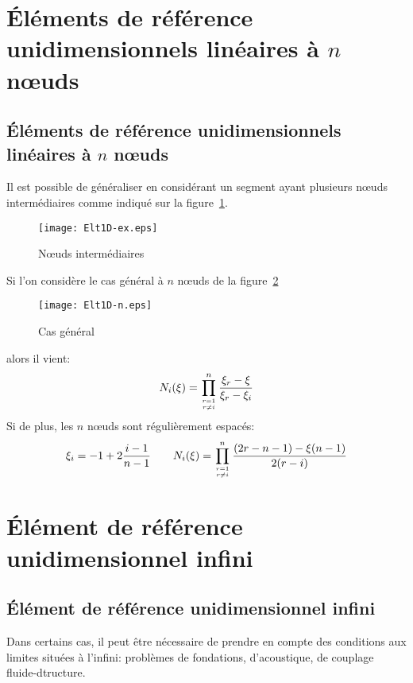 \medskip
{}




\medskip
\ifVersionAvecExemplesSepares
   \section{Éléments de référence unidimensionnels linéaires à $n$ nœuds}
\else
   \subsection{Éléments de référence unidimensionnels linéaires à $n$ nœuds}
\fi

Il est possible de généraliser en considérant un segment ayant plusieurs nœuds 
intermédiaires comme indiqué sur la figure~\ref{fig:ex2:noeudint}.
\begin{figure}[ht]\centering
\texttt{[image: Elt1D-ex.eps]}
\caption{Nœuds  intermédiaires}\label{fig:ex2:noeudint}
\end{figure}
\medskip
Si l'on considère le cas général à $n$ nœuds de la figure~\ref{fig:ex2:casgen}
\begin{figure}[ht]\centering
\texttt{[image: Elt1D-n.eps]}
\caption{Cas général}\label{fig:ex2:casgen}
\end{figure}
alors il vient:
\begin{equation} N_i(\xi) = \prod_{r=1\atop r\ne i}^n \dfrac{\xi_r-\xi}{\xi_r-\xi_i} \end{equation}
\medskip
Si de plus, les $n$ nœuds sont régulièrement espacés:
\begin{equation}\xi_i = -1+2\frac{i-1}{n-1} \qquad
N_i(\xi) = \prod_{r=1\atop r\ne i}^n \dfrac{(2r-n-1)-\xi(n-1)}{2(r-i)} \end{equation}

\medskip
\ifVersionAvecExemplesSepares
   \section{Élément de référence unidimensionnel infini}
\else
   \subsection{Élément de référence unidimensionnel infini}
\fi

Dans certains cas, il peut être nécessaire de prendre en compte des conditions aux limites situées à
l'infini: problèmes de fondations, d'acoustique, de couplage fluide-dtructure.

